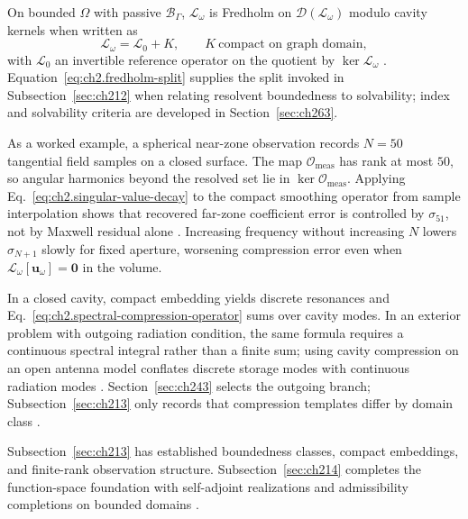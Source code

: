 On bounded \(\Omega\) with passive \(\mathcal{B}_\Gamma\), \(\mathcal{L}_\omega\) is Fredholm on \(\mathcal{D}(\mathcal{L}_\omega)\) modulo cavity kernels when written as
\begin{equation}
\label{eq:ch2.fredholm-split}
\mathcal{L}_\omega
=
\mathcal{L}_0+K,
\qquad
K\ \text{compact on graph domain},
\end{equation}
with \(\mathcal{L}_0\) an invertible reference operator on the quotient by \(\ker\mathcal{L}_\omega\) \cite{stratton1941}. Equation~\eqref{eq:ch2.fredholm-split} supplies the split invoked in Subsection~\ref{sec:ch212} when relating resolvent boundedness to solvability; index and solvability criteria are developed in Section~\ref{sec:ch263}.

As a worked example, a spherical near-zone observation records \(N=50\) tangential field samples on a closed surface. The map \(\mathcal{O}_{\mathrm{meas}}\) has rank at most \(50\), so angular harmonics beyond the resolved set lie in \(\ker\mathcal{O}_{\mathrm{meas}}\). Applying Eq.~\eqref{eq:ch2.singular-value-decay} to the compact smoothing operator from sample interpolation shows that recovered far-zone coefficient error is controlled by \(\sigma_{51}\), not by Maxwell residual alone \cite{stratton1941}. Increasing frequency without increasing \(N\) lowers \(\sigma_{N+1}\) slowly for fixed aperture, worsening compression error even when \(\mathcal{L}_\omega[\mathbf{u}_\omega]=\mathbf{0}\) in the volume.

In a closed cavity, compact embedding yields discrete resonances and Eq.~\eqref{eq:ch2.spectral-compression-operator} sums over cavity modes. In an exterior problem with outgoing radiation condition, the same formula requires a continuous spectral integral rather than a finite sum; using cavity compression on an open antenna model conflates discrete storage modes with continuous radiation modes \cite{stratton1941}. Section~\ref{sec:ch243} selects the outgoing branch; Subsection~\ref{sec:ch213} only records that compression templates differ by domain class \cite{stratton1941}.

Subsection~\ref{sec:ch213} has established boundedness classes, compact embeddings, and finite-rank observation structure. Subsection~\ref{sec:ch214} completes the function-space foundation with self-adjoint realizations and admissibility completions on bounded domains \cite{stratton1941}.
